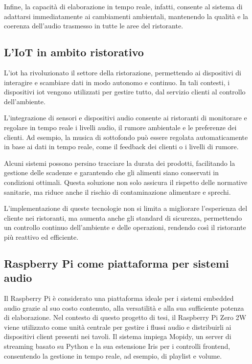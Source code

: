 Infine, la capacità di elaborazione in tempo reale, infatti, consente al sistema di adattarsi immediatamente ai cambiamenti ambientali, mantenendo la qualità e la coerenza dell’audio trasmesso in tutte le aree del ristorante.

\newpage
\subsection{L'IoT in ambito ristorativo}
\noindent

L'\gls{iot} ha rivoluzionato il settore della ristorazione, permettendo ai dispositivi di interagire e scambiare dati in modo autonomo e continuo. In tali contesti, i dispositivi \gls{iot} vengono utilizzati per gestire tutto, dal servizio clienti al controllo dell'ambiente.

L'integrazione di sensori e dispositivi audio consente ai ristoranti di monitorare e regolare in tempo reale i livelli audio, il rumore ambientale e le preferenze dei clienti. Ad esempio, la musica di sottofondo può essere regolata automaticamente in base ai dati in tempo reale, come il feedback dei clienti o i livelli di rumore.

Alcuni sistemi possono persino tracciare la durata dei prodotti, facilitando la gestione delle scadenze e garantendo che gli alimenti siano conservati in condizioni ottimali. Questa soluzione non solo assicura il rispetto delle normative sanitarie, ma riduce anche il rischio di contaminazione alimentare e sprechi. \cite{10593159}

L'implementazione di queste tecnologie non si limita a migliorare l'esperienza del cliente nei ristoranti, ma aumenta anche gli standard di sicurezza, permettendo un controllo continuo dell'ambiente e delle operazioni, rendendo così il ristorante più reattivo ed efficiente.
\subsection{Raspberry Pi come piattaforma per sistemi audio}
\noindent

Il Raspberry Pi è considerato una piattaforma ideale per i sistemi embedded audio grazie al suo costo contenuto, alla versatilità e alla sua sufficiente potenza di elaborazione. Nel contesto di questo progetto di tesi, il Raspberry Pi Zero 2W viene utilizzato come unità centrale per gestire i flussi audio e distribuirli ai dispositivi client presenti nei tavoli. Il sistema impiega Mopidy, un server di streaming basato su Python e la sua estensione Iris per i controlli frontend, consentendo la gestione in tempo reale, ad esempio, di playlist e volume.

